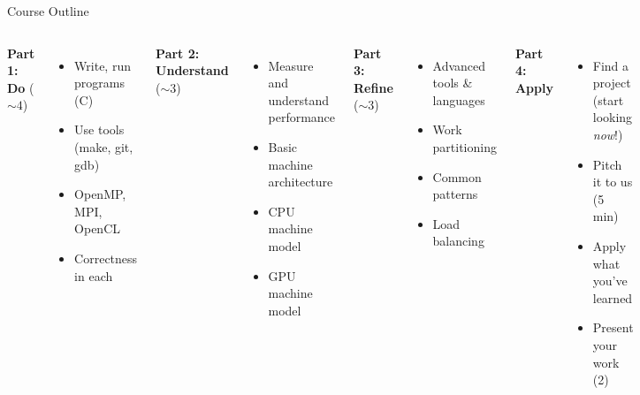 \documentclass[english,compress]{beamer}
\begin{document}
\begin{frame}{Course Outline}
  \begin{columns}
    \textbf{Part 1: Do} ($\sim 4$)

    \begin{itemize}
      \item Write, run programs (C)
      \item Use tools (make, git, gdb)
      \item OpenMP, MPI, OpenCL
      \item Correctness in each
    \end{itemize}

    \medskip
    \textbf{Part 2: Understand} ($\sim$3)

    \begin{itemize}
      \item Measure and understand performance
      \item Basic machine architecture
      \item CPU machine model
      \item GPU machine model
    \end{itemize}

    \textbf{Part 3: Refine} ($\sim$3)

    \begin{itemize}
      \item Advanced tools \& languages
      \item Work partitioning
      \item Common patterns
      \item Load balancing
    \end{itemize}

    \medskip
    \textbf{Part 4: Apply}

    \begin{itemize}
      \item Find a project\\
        (start looking \emph{now}!)
      \item Pitch it to us (5 min)
      \item Apply what you've learned
      \item Present your work (2)
    \end{itemize}
  \end{columns}
\end{frame}
\end{document}
